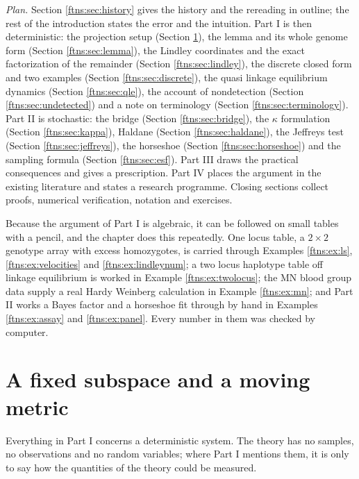 \noindent\emph{Plan.} Section \ref{ftns:sec:history} gives the history and the rereading in outline; the rest of the
introduction states the error and the intuition. Part I is then deterministic: the projection setup
(Section \ref{ftns:sec:setup}), the lemma and its
whole genome form (Section \ref{ftns:sec:lemma}), the Lindley coordinates and the exact factorization of the remainder
(Section \ref{ftns:sec:lindley}), the discrete closed form and two examples
(Section \ref{ftns:sec:discrete}), the quasi linkage equilibrium dynamics (Section \ref{ftns:sec:qle}), the
account of nondetection (Section \ref{ftns:sec:undetected}) and a note on terminology
(Section \ref{ftns:sec:terminology}). Part II is stochastic: the bridge (Section \ref{ftns:sec:bridge}), the
$\kappa$ formulation (Section \ref{ftns:sec:kappa}), Haldane (Section \ref{ftns:sec:haldane}), the Jeffreys
test (Section \ref{ftns:sec:jeffreys}), the horseshoe (Section \ref{ftns:sec:horseshoe}) and the sampling
formula (Section \ref{ftns:sec:esf}). Part III draws the practical consequences and gives a
prescription. Part IV places the argument in the existing literature and states a research
programme. Closing sections collect proofs, numerical verification, notation and exercises.

Because the argument of Part I is algebraic, it can be followed on small tables with a pencil, and
the chapter does this repeatedly. One locus table, a $2\times2$ genotype array with excess
homozygotes, is carried through Examples \ref{ftns:ex:ls}, \ref{ftns:ex:velocities} and
\ref{ftns:ex:lindleynum}; a two locus haplotype table off linkage equilibrium is worked in
Example \ref{ftns:ex:twolocus}; the MN blood group data supply a real Hardy Weinberg calculation in
Example \ref{ftns:ex:mn}; and Part II works a Bayes factor and a horseshoe fit through by hand in
Examples \ref{ftns:ex:assay} and \ref{ftns:ex:panel}. Every number in them was checked by
computer.


\section{A fixed subspace and a moving metric}
\label{ftns:sec:setup}

Everything in Part I concerns a deterministic system. The theory has no samples, no observations and no
random variables; where Part I mentions them, it is only to say how the quantities of the theory could be measured.

